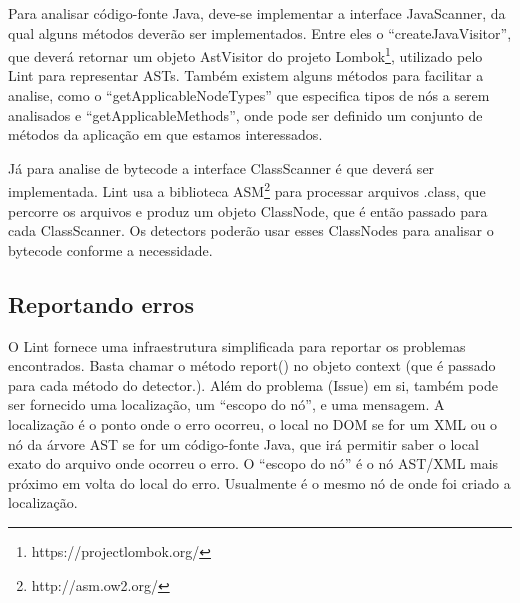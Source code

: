 Para analisar código-fonte Java, deve-se implementar a interface JavaScanner, da 
qual alguns métodos deverão ser implementados. Entre eles o “createJavaVisitor”, 
que deverá retornar um objeto AstVisitor do projeto Lombok\footnote{https://projectlombok.org/}, 
utilizado pelo Lint para representar ASTs. Também existem alguns métodos para facilitar 
a analise, como o “getApplicableNodeTypes” que especifica tipos de nós a serem analisados 
e “getApplicableMethods”, onde pode ser definido um conjunto de métodos da aplicação
em que estamos interessados.

Já para analise de bytecode a interface ClassScanner é que deverá ser implementada. 
Lint usa a biblioteca ASM\footnote{http://asm.ow2.org/} para processar arquivos .class, que percorre os arquivos 
e produz um objeto ClassNode, que é então passado para cada ClassScanner. Os detectors 
poderão usar esses ClassNodes para analisar o bytecode conforme a necessidade.

\subsection{Reportando erros}
O Lint fornece uma infraestrutura simplificada para reportar os problemas encontrados. 
Basta chamar o método report() no objeto context (que é passado para cada método do detector.). 
Além do problema (Issue) em si, também pode ser fornecido uma localização, um “escopo do nó”, 
e uma mensagem. A localização é o ponto onde o erro ocorreu, o local no DOM se for um XML ou 
o nó da árvore AST se for um código-fonte Java, que irá permitir saber o local exato do arquivo 
onde ocorreu o erro. O “escopo do nó” é o nó AST/XML mais próximo em volta do local do erro. 
Usualmente é o mesmo nó de onde foi criado a localização.

